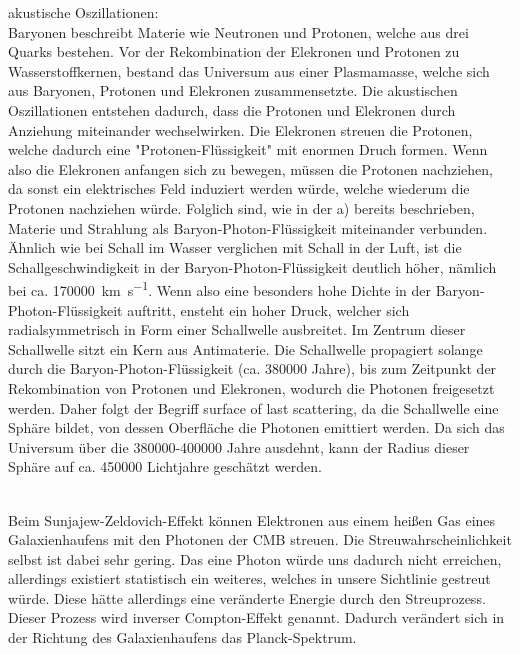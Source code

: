     \justifying akustische Oszillationen:\\
    Baryonen beschreibt Materie wie Neutronen und Protonen, welche aus drei Quarks bestehen. Vor der Rekombination der Elekronen und Protonen zu Wasserstoffkernen, 
    bestand das Universum aus einer Plasmamasse, welche sich aus Baryonen, Protonen und Elekronen zusammensetzte. 
    Die akustischen Oszillationen entstehen dadurch, dass die Protonen und Elekronen durch Anziehung miteinander wechselwirken. 
    Die Elekronen streuen die Protonen, welche dadurch eine "Protonen-Flüssigkeit" mit enormen Druch formen.
    Wenn also die Elekronen anfangen sich zu bewegen, müssen die Protonen nachziehen, da sonst ein elektrisches Feld induziert
    werden würde, welche wiederum die Protonen nachziehen würde. 
    Folglich sind, wie in der a) bereits beschrieben, Materie und Strahlung als Baryon-Photon-Flüssigkeit miteinander verbunden. 
    Ähnlich wie bei Schall im Wasser verglichen mit Schall in der Luft, ist die Schallgeschwindigkeit in der Baryon-Photon-Flüssigkeit 
    deutlich höher, nämlich bei ca. \SI{170000}{\kilo\meter\per\second}. Wenn also eine besonders hohe Dichte in der Baryon-Photon-Flüssigkeit
    auftritt, ensteht ein hoher Druck, welcher sich radialsymmetrisch in Form einer Schallwelle ausbreitet. Im Zentrum dieser Schallwelle sitzt
    ein Kern aus Antimaterie. Die Schallwelle propagiert solange durch die Baryon-Photon-Flüssigkeit (ca. 380000 Jahre), bis zum Zeitpunkt der Rekombination von
    Protonen und Elekronen, wodurch die Photonen freigesetzt werden. Daher folgt der Begriff surface of last scattering, da die Schallwelle eine Sphäre bildet,
    von dessen Oberfläche die Photonen emittiert werden. Da sich das Universum über die 380000-400000 Jahre ausdehnt, kann der Radius dieser Sphäre 
    auf ca. 450000 Lichtjahre geschätzt werden.  
    

    \justifying\\
    Beim Sunjajew-Zeldovich-Effekt können Elektronen aus einem heißen Gas
    eines Galaxienhaufens mit den Photonen der CMB streuen.
    Die Streuwahrscheinlichkeit selbst ist dabei sehr gering. Das
    eine Photon würde uns dadurch nicht erreichen, allerdings existiert 
    statistisch ein weiteres, welches in unsere Sichtlinie
    gestreut würde. Diese hätte allerdings eine veränderte Energie
    durch den Streuprozess. Dieser Prozess wird inverser Compton-Effekt genannt.
    Dadurch verändert sich in der Richtung des Galaxienhaufens das Planck-Spektrum.



